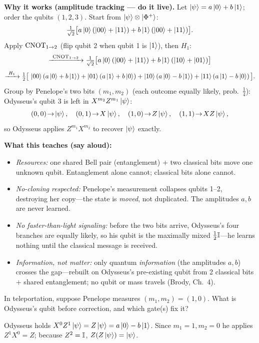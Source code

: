 \documentclass[11pt]{article}
\begin{document}
\begin{board}
\textbf{Why it works (amplitude tracking --- do it live).} Let $\ket\psi=a\ket0+b\ket1$;
order the qubits $(1,2,3)$. Start from $\ket\psi\otimes\ket{\Phi^+}$:
\[
  \tfrac1{\sqrt2}\big[a\ket0(\ket{00}+\ket{11})+b\ket1(\ket{00}+\ket{11})\big].
\]
Apply $\mathrm{CNOT}_{1\to2}$ (flip qubit 2 when qubit 1 is $\ket1$), then $H_1$:
\[
  \xrightarrow{\ \mathrm{CNOT}_{1\to2}\ }
  \tfrac1{\sqrt2}\big[a\ket0(\ket{00}+\ket{11})+b\ket1(\ket{10}+\ket{01})\big]
\]
\[
  \xrightarrow{\ H_1\ }\tfrac12\big[\,
  \ket{00}(a\ket0+b\ket1)+\ket{01}(a\ket1+b\ket0)
  +\ket{10}(a\ket0-b\ket1)+\ket{11}(a\ket1-b\ket0)\,\big].
\]
Group by Penelope's two bits $(m_1,m_2)$ (each outcome equally likely, prob.\ $\tfrac14$):
Odysseus's qubit 3 is left in $X^{m_2}Z^{m_1}\ket\psi$:
\[
  (0,0)\!\to\!\ket\psi,\quad (0,1)\!\to\! X\ket\psi,\quad
  (1,0)\!\to\! Z\ket\psi,\quad (1,1)\!\to\! XZ\ket\psi,
\]
so Odysseus applies $Z^{m_1}X^{m_2}$ to recover $\ket\psi$ exactly.
\end{board}

\noindent\textbf{What this teaches (say aloud):}
\begin{itemize}[leftmargin=1.5em,itemsep=1pt,topsep=2pt]
  \item \emph{Resources:} one shared Bell pair (entanglement) $+$ two classical bits move one
        unknown qubit. Entanglement alone cannot; classical bits alone cannot.
  \item \emph{No-cloning respected:} Penelope's measurement collapses qubits 1--2, destroying her
        copy---the state is \emph{moved}, not duplicated. The amplitudes $a,b$ are never learned.
  \item \emph{No faster-than-light signaling:} before the two bits arrive, Odysseus's four branches are
        equally likely, so his qubit is the maximally mixed $\tfrac12\mathbb{I}$---he learns nothing until
        the classical message is received.
  \item \emph{Information, not matter:} only quantum \emph{information} (the amplitudes $a,b$)
        crosses the gap---rebuilt on Odysseus's pre-existing qubit from 2 classical bits $+$ shared
        entanglement; no qubit or mass travels (Brody, Ch.~4).
\end{itemize}

\begin{inclass}\label{ic:tele}
In teleportation, suppose Penelope measures $(m_1,m_2)=(1,0)$. What is Odysseus's qubit before
correction, and which gate(s) fix it?
\end{inclass}
\begin{answer}
Odysseus holds $X^{0}Z^{1}\ket\psi=Z\ket\psi=a\ket0-b\ket1$. Since $m_1=1,m_2=0$ he applies
$Z^{1}X^{0}=Z$; because $Z^2=\mathbb{I}$, $Z(Z\ket\psi)=\ket\psi$. \checkmark
\end{answer}
\end{document}
